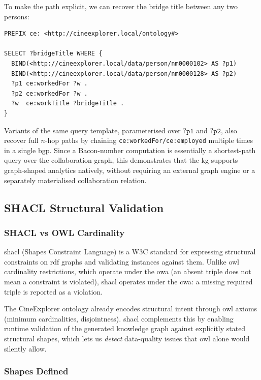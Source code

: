 To make the path explicit, we can recover the bridge title between any two persons:

\begin{lstlisting}[language=SPARQL]
PREFIX ce: <http://cineexplorer.local/ontology#>

SELECT ?bridgeTitle WHERE {
  BIND(<http://cineexplorer.local/data/person/nm0000102> AS ?p1)
  BIND(<http://cineexplorer.local/data/person/nm0000128> AS ?p2)
  ?p1 ce:workedFor ?w .
  ?p2 ce:workedFor ?w .
  ?w  ce:workTitle ?bridgeTitle .
}
\end{lstlisting}

Variants of the same query template, parameterised over $\texttt{?p1}$ and $\texttt{?p2}$, also recover full $n$-hop paths by chaining \texttt{ce:workedFor/ce:employed} multiple times in a single \ac{bgp}. Since a Bacon-number computation is essentially a shortest-path query over the collaboration graph, this demonstrates that the \ac{kg} supports graph-shaped analytics natively, without requiring an external graph engine or a separately materialised collaboration relation.

\subsection{SHACL Structural Validation}

\subsubsection{SHACL vs OWL Cardinality}

\ac{shacl} (Shapes Constraint Language) is a W3C standard for expressing structural constraints on \ac{rdf} graphs and validating instances against them. Unlike \ac{owl} cardinality restrictions, which operate under the \ac{owa} (an absent triple does not mean a constraint is violated), \ac{shacl} operates under the \ac{cwa}: a missing required triple is reported as a violation.

The CineExplorer ontology already encodes structural intent through \ac{owl} axioms (minimum cardinalities, disjointness). \ac{shacl} complements this by enabling runtime validation of the generated knowledge graph against explicitly stated structural shapes, which lets us \emph{detect} data-quality issues that \ac{owl} alone would silently allow.

\subsubsection{Shapes Defined}

